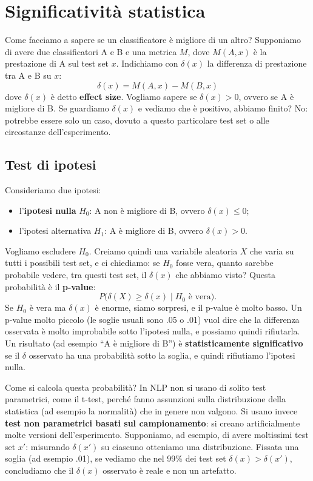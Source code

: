 \section{Significatività statistica}
Come facciamo a sapere se un classificatore è migliore di un altro? Supponiamo di avere due classificatori A e B e una metrica $M$, dove $M(A, x)$ è la prestazione di A sul test set $x$. Indichiamo con $\delta(x)$ la differenza di prestazione tra A e B su $x$:
\begin{equation}
\delta(x) = M(A, x) - M(B, x)
\end{equation}
dove $\delta(x)$ è detto \textbf{effect size}. Vogliamo sapere se $\delta(x) > 0$, ovvero se A è migliore di B. Se guardiamo $\delta(x)$ e vediamo che è positivo, abbiamo finito? No: potrebbe essere solo un caso, dovuto a questo particolare test set o alle circostanze dell'esperimento.

\subsection{Test di ipotesi}
Consideriamo due ipotesi:
\begin{itemize}
    \item l'\textbf{ipotesi nulla} $H_0$: A non è migliore di B, ovvero $\delta(x) \leq 0$;
    \item l'ipotesi alternativa $H_1$: A è migliore di B, ovvero $\delta(x) > 0$.
\end{itemize}
Vogliamo escludere $H_0$. Creiamo quindi una variabile aleatoria $X$ che varia su tutti i possibili test set, e ci chiediamo: se $H_0$ fosse vera, quanto sarebbe probabile vedere, tra questi test set, il $\delta(x)$ che abbiamo visto? Questa probabilità è il \textbf{p-value}:
\begin{equation}
P\big(\delta(X) \geq \delta(x) \mid H_0 \text{ è vera}\big).
\end{equation}
Se $H_0$ è vera ma $\delta(x)$ è enorme, siamo sorpresi, e il p-value è molto basso. Un p-value molto piccolo (le soglie usuali sono .05 o .01) vuol dire che la differenza osservata è molto improbabile sotto l'ipotesi nulla, e possiamo quindi rifiutarla. Un risultato (ad esempio \enquote{A è migliore di B}) è \textbf{statisticamente significativo} se il $\delta$ osservato ha una probabilità sotto la soglia, e quindi rifiutiamo l'ipotesi nulla.

Come si calcola questa probabilità? In NLP non si usano di solito test parametrici, come il t-test, perché fanno assunzioni sulla distribuzione della statistica (ad esempio la normalità) che in genere non valgono. Si usano invece \textbf{test non parametrici basati sul campionamento}: si creano artificialmente molte versioni dell'esperimento. Supponiamo, ad esempio, di avere moltissimi test set $x'$: misurando $\delta(x')$ su ciascuno otteniamo una distribuzione. Fissata una soglia (ad esempio .01), se vediamo che nel 99\% dei test set $\delta(x) > \delta(x')$, concludiamo che il $\delta(x)$ osservato è reale e non un artefatto.

